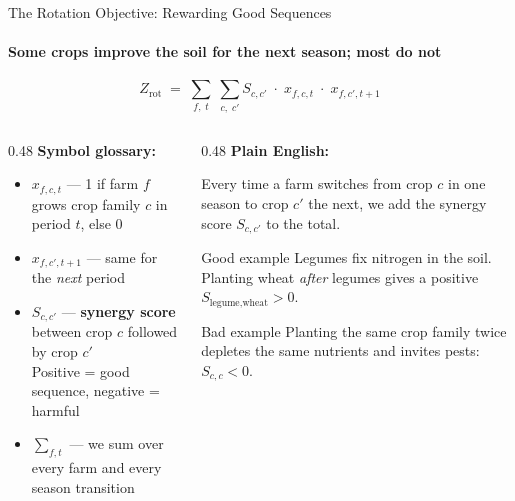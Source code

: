 \documentclass[aspectratio=169,10pt]{beamer}
\begin{document}
\begin{frame}{The Rotation Objective: Rewarding Good Sequences}
    \framesubtitle{Some crops improve the soil for the next season; most do not}

    \begin{equation*}
        Z_{\text{rot}} \;=\;
        \sum_{f,\;t} \;\sum_{c,\;c'}
        S_{c,c'} \;\cdot\; x_{f,c,t} \;\cdot\; x_{f,c',t+1}
    \end{equation*}

    \vspace{0.4cm}
    \begin{columns}[T]
        \begin{column}{0.48\textwidth}
            \textbf{Symbol glossary:}
            \vspace{0.2cm}
            \begin{itemize}
                \item $x_{f,c,t}$ --- 1 if farm $f$ grows crop family
                      $c$ in period $t$, else 0
                \item $x_{f,c',t+1}$ --- same for the \emph{next} period
                \item $S_{c,c'}$ --- \textbf{synergy score} between
                      crop $c$ followed by crop $c'$\\
                      {\small Positive = good sequence,
                       negative = harmful}
                \item $\sum_{f,t}$ --- we sum over every farm
                      and every season transition
            \end{itemize}
        \end{column}
        \begin{column}{0.48\textwidth}
            \textbf{Plain English:}
            \vspace{0.2cm}

            Every time a farm switches from crop $c$ in one
            season to crop $c'$ the next, we add the synergy
            score $S_{c,c'}$ to the total.

            \vspace{0.3cm}
            \begin{exampleblock}{Good example}
                \small Legumes fix nitrogen in the soil.
                Planting wheat \emph{after} legumes gives a
                positive $S_{\text{legume,wheat}} > 0$.
            \end{exampleblock}
            \begin{alertblock}{Bad example}
                \small Planting the same crop family twice
                depletes the same nutrients and invites pests:
                $S_{c,c} < 0$.
            \end{alertblock}
        \end{column}
    \end{columns}
\end{frame}
\end{document}
